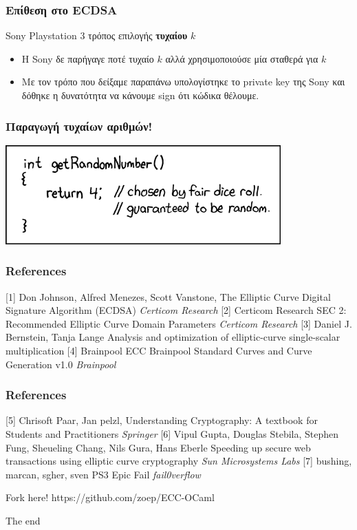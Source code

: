 \documentclass{beamer}
\begin{document}
%
\begin{frame}
\frametitle{Επίθεση στο ECDSA}
\begin{block}
{Sony Playstation 3 τρόπος επιλογής \textbf{τυχαίου} $k$}
\begin{itemize}
\item Η Sony δε παρήγαγε ποτέ τυχαίο $k$ αλλά χρησιμοποιούσε μία σταθερά για $k$
\item Με τον τρόπο που δείξαμε παραπάνω υπολογίστηκε το private key της Sony και δόθηκε η δυνατότητα να κάνουμε sign ότι κώδικα θέλουμε. \cite{PS3}
\end{itemize}
\end{block}
\end{frame}

 \begin{frame}
\frametitle{Παραγωγή τυχαίων αριθμών!}
 \includegraphics[scale=0.7]{random_number.png}
\end{frame}

\begin{frame}
\frametitle{References}
\footnotesize{
\begin{thebibliography}{99}
   [1] Don Johnson, Alfred Menezes, Scott Vanstone,
 \newblock The Elliptic Curve Digital Signature Algorithm (ECDSA)
 \newblock \emph{Certicom Research}
   [2] Certicom Research
 \newblock SEC 2: Recommended Elliptic Curve Domain Parameters
 \newblock \emph{Certicom Research}
    [3] Daniel J. Bernstein, Tanja Lange
 \newblock Analysis and optimization of elliptic-curve single-scalar multiplication
   [4] Brainpool
 \newblock ECC Brainpool Standard Curves and Curve Generation v1.0
 \newblock \emph{Brainpool}
\end{thebibliography}
}
\end{frame}
 
\begin{frame}
\frametitle{References}
\footnotesize{
\begin{thebibliography}{99}
   [5] Chrisoft Paar, Jan pelzl,
 \newblock Understanding Cryptography: A textbook for Students and Practitioners
 \newblock \emph{Springer}
    [6] Vipul Gupta, Douglas Stebila, Stephen Fung, Sheueling Chang, Nils Gura, Hans Eberle
 \newblock Speeding up secure web transactions using elliptic curve cryptography
 \newblock \emph{Sun Microsystems Labs}
     [7] bushing, marcan, sgher, sven
 \newblock PS3 Epic Fail
 \newblock \emph{fail0verflow}
\end{thebibliography}
}
\end{frame}

 
\begin{frame}
\begin{block}
{Fork here!}
https://github.com/zoep/ECC-OCaml
\end{block}
\bigskip
\begin{block}
{The end}
\end{block}
\end{frame}
\end{document}
